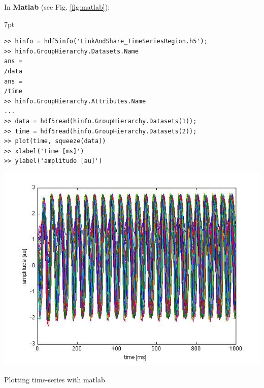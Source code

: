 \documentclass{tufte-handout}
\newenvironment{blah}{%
  \def\FrameCommand{%
    \hspace{1pt}%
    {\color{DarkOrange}\vrule width 2pt}%
    {\color{PeachPuff}\vrule width 4pt}%
    \colorbox{PeachPuff}%
  }%
  \MakeFramed{\advance\hsize-\width\FrameRestore}%
  \noindent\hspace{-4.55pt}%
  \begin{adjustwidth}{}{7pt}%
  \vspace{2pt}\vspace{2pt}%
}
{%
  \vspace{2pt}\end{adjustwidth}\endMakeFramed%
}
\begin{document}
In \textbf{Matlab} (see Fig. \ref{fig:matlab}):

\begin{blah}
\begin{verbatim}
>> hinfo = hdf5info('LinkAndShare_TimeSeriesRegion.h5');
>> hinfo.GroupHierarchy.Datasets.Name
ans =
/data
ans =
/time
>> hinfo.GroupHierarchy.Attributes.Name
...
>> data = hdf5read(hinfo.GroupHierarchy.Datasets(1));
>> time = hdf5read(hinfo.GroupHierarchy.Datasets(2));
>> plot(time, squeeze(data))
>> xlabel('time [ms]')	
>> ylabel('amplitude [au]')
\end{verbatim}
\end{blah}

\begin{marginfigure}
  \includegraphics[width=\linewidth]{Handout_UI_LinkAndShare_MatlabTimeSeriesRegion.png}%
  \caption{Plotting time-series with matlab.}%
  \label{fig:matlab}%
\end{marginfigure}
\end{document}
